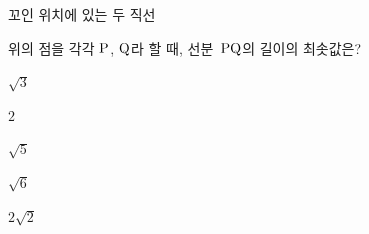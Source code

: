 꼬인 위치에 있는 두 직선 \par\smallskip{}\par\smallskip\noindent 위의 점을 각각 $\mathrm{P}$, $\mathrm{Q}$라 할 때, 선분~$\mathrm{PQ}$의 길이의 최솟값은?
\begin{choices32}{\rule[-3ex]{0pt}{8ex}$\sqrt{3}$}{\rule[-3ex]{0pt}{8ex}$2$}{\rule[-3ex]{0pt}{8ex}$\sqrt{5}$}{\rule[-3ex]{0pt}{8ex}$\sqrt{6}$}{\rule[-3ex]{0pt}{8ex}$2\sqrt{2}$}\end{choices32}
